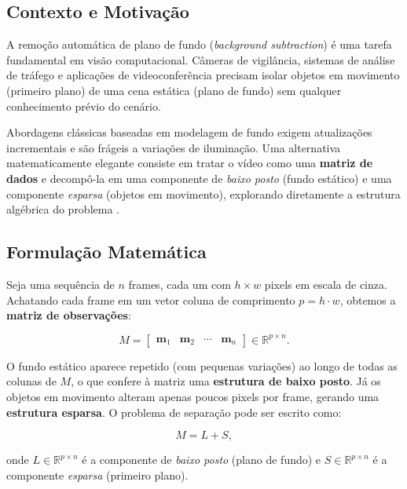 \documentclass[12pt, a4paper]{article}
\begin{document}
\subsection{Contexto e Motivação}

A remoção automática de plano de fundo (\emph{background subtraction}) é uma tarefa
fundamental em visão computacional. Câmeras de vigilância, sistemas de análise de
tráfego e aplicações de videoconferência precisam isolar objetos em movimento
(primeiro plano) de uma cena estática (plano de fundo) sem qualquer conhecimento
prévio do cenário.

Abordagens clássicas baseadas em modelagem de fundo exigem atualizações incrementais
e são frágeis a variações de iluminação. Uma alternativa matematicamente elegante
consiste em tratar o vídeo como uma \textbf{matriz de dados} e decompô-la em uma
componente de \emph{baixo posto} (fundo estático) e uma componente \emph{esparsa}
(objetos em movimento), explorando diretamente a estrutura algébrica do problema
\cite{candes2011robust}.

\subsection{Formulação Matemática}

Seja uma sequência de $n$ frames, cada um com $h \times w$ pixels em escala de cinza.
Achatando cada frame em um vetor coluna de comprimento $p = h \cdot w$, obtemos a
\textbf{matriz de observações}:

\begin{equation}
  M = \begin{bmatrix}
    \mathbf{m}_1 & \mathbf{m}_2 & \cdots & \mathbf{m}_n
  \end{bmatrix} \in \mathbb{R}^{p \times n}.
  \label{eq:M}
\end{equation}

O fundo estático aparece repetido (com pequenas variações) ao longo de todas as
colunas de $M$, o que confere à matriz uma \textbf{estrutura de baixo posto}. Já
os objetos em movimento alteram apenas poucos pixels por frame, gerando uma
\textbf{estrutura esparsa}. O problema de separação pode ser escrito como:

\begin{equation}
  M = L + S,
  \label{eq:decomp}
\end{equation}

onde $L \in \mathbb{R}^{p \times n}$ é a componente de \emph{baixo posto}
(plano de fundo) e $S \in \mathbb{R}^{p \times n}$ é a componente \emph{esparsa}
(primeiro plano).
\end{document}
